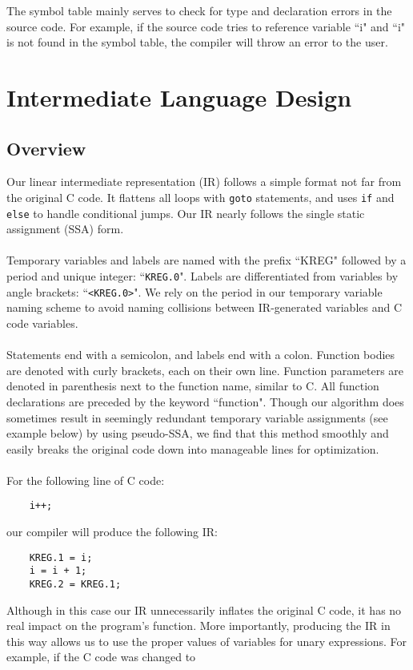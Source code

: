 \documentclass{scrartcl}
\begin{document}
The symbol table mainly serves to check for type and declaration errors in the source code. For example, if the source code tries to reference variable ``i" and ``i" is not found in the symbol table, the compiler will throw an error to the user.

\section{Intermediate Language Design}
\subsection{Overview}
Our linear intermediate representation (IR) follows a simple format not far from the original C code. It flattens all loops with \verb|goto| statements, and uses \verb|if| and \verb|else| to handle conditional jumps. Our IR nearly follows the single static assignment (SSA) form.\\
\\
Temporary variables and labels are named with the prefix ``KREG" followed by a period and unique integer: ``\verb|KREG.0|". Labels are differentiated from variables by angle brackets: ``\verb|<KREG.0>|". We rely on the period in our temporary variable naming scheme to avoid naming collisions between IR-generated variables and C code variables.\\
\\
Statements end with a semicolon, and labels end with a colon. Function bodies are denoted with curly brackets, each on their own line. Function parameters are denoted in parenthesis next to the function name, similar to C. All function declarations are preceded by the keyword ``function".
Though our algorithm does sometimes result in seemingly redundant temporary variable assignments (see example below) by using pseudo-SSA, we find that this method smoothly and easily breaks the original code down into manageable lines for optimization.\\
\\
For the following line of C code:
\begin{verbatim}
    i++;
\end{verbatim}
our compiler will produce the following IR:
\begin{verbatim}
    KREG.1 = i;
    i = i + 1;
    KREG.2 = KREG.1;
\end{verbatim}
Although in this case our IR unnecessarily inflates the original C code, it has no real impact on the program's function. More importantly, producing the IR in this way allows us to use the proper values of variables for unary expressions. For example, if the C code was changed to
\end{document}
